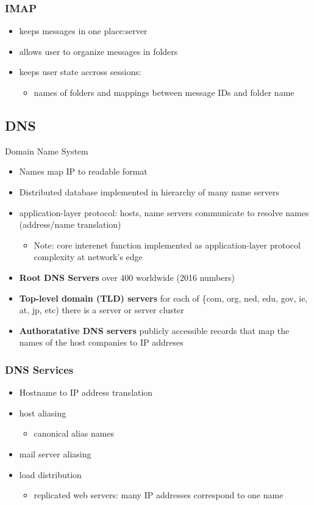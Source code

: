 \documentclass[11pt]{article}
\begin{document}
\subsubsection{IMAP}
\label{sec:org91c413f}
\begin{itemize}
\item keeps messages in one place:server
\item allows user to organize messages in folders
\item keeps user state accross sessions:
\begin{itemize}
\item names of folders and mappings between message IDs and folder name
\end{itemize}
\end{itemize}

\subsection{DNS}
\label{sec:orgbc6af76}
Domain Name System

\begin{itemize}
\item Names map IP to readable format
\item Distributed database implemented in hierarchy of many name servers
\item application-layer protocol: hosts, name servers communicate to
resolve names (address/name translation)
\begin{itemize}
\item Note: core interenet function implemented as application-layer
protocol complexity at network's edge
\end{itemize}

\item \textbf{Root DNS Servers} over 400 worldwide (2016 numbers)
\item \textbf{Top-level domain (TLD) servers} for each of \{com, org, ned, edu,
gov, ie, at, jp, etc) there is a server or server cluster
\item \textbf{Authoratative DNS servers} publicly accessible records that map the
names of the host companies to IP addreses
\end{itemize}


\subsubsection{DNS Services}
\label{sec:orge816d2d}
\begin{itemize}
\item Hostname to IP address translation
\item host aliasing
\begin{itemize}
\item canonical alias names
\end{itemize}
\item mail server aliasing
\item load distribution 
\begin{itemize}
\item replicated web servers: many IP addresses correspond to one name
\end{itemize}
\end{itemize}
\end{document}
